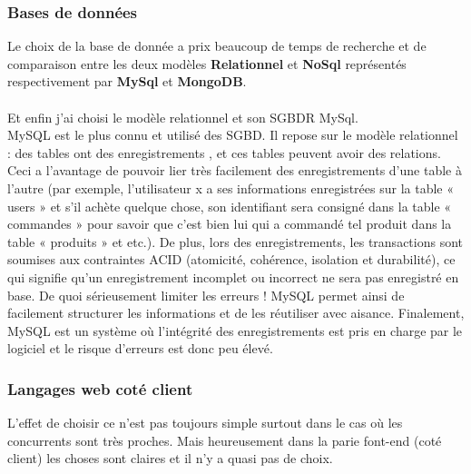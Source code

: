 \documentclass[12pt]{article}
\begin{document}
\subsubsection{Bases de données}
 Le choix de la base de donnée  a prix beaucoup de temps de recherche et de comparaison entre les deux modèles
  \textbf{Relationnel} et \textbf{NoSql} représentés respectivement par \textbf{MySql} et \textbf{MongoDB}.\\
   \\
Et enfin j'ai choisi le modèle relationnel et son SGBDR MySql.\\

MySQL est le plus connu et utilisé des SGBD. Il repose sur le modèle relationnel : des tables ont des enregistrements , et ces tables peuvent avoir des relations. Ceci a l’avantage de pouvoir lier très facilement des enregistrements d’une table à l’autre (par exemple, l’utilisateur x a ses informations enregistrées sur la table « users » et s’il achète quelque chose, son identifiant sera consigné dans la table « commandes » pour savoir que c’est bien lui qui a commandé tel produit dans la table « produits » et etc.). De plus, lors des enregistrements, les transactions sont soumises aux contraintes ACID (atomicité, cohérence, isolation et durabilité), ce qui signifie qu’un enregistrement incomplet ou incorrect ne sera pas enregistré en base. De quoi sérieusement limiter les erreurs ! MySQL permet ainsi de facilement structurer les informations et de les réutiliser avec aisance. Finalement, MySQL est un système où l’intégrité des enregistrements est pris en charge par le logiciel et le risque d’erreurs est donc peu élevé.


  
   

\subsubsection{Langages web coté client}

L'effet de choisir ce n'est pas toujours simple surtout dans le cas où les concurrents sont très proches.
Mais heureusement dans la parie font-end (coté client) les choses sont claires et il n'y a quasi pas de choix.
\end{document}
